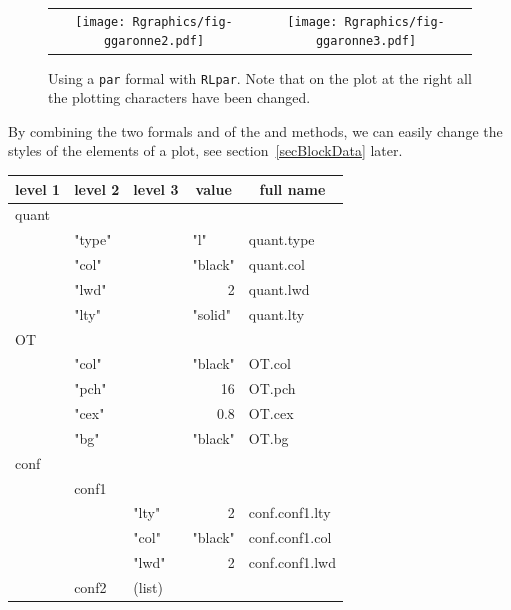 \documentclass[a4paper]{report}
\begin{document}
\begin{figure}
   \centering
   \begin{tabular}{c c} 
     \texttt{[image: Rgraphics/fig-ggaronne2.pdf]} &
     \texttt{[image: Rgraphics/fig-ggaronne3.pdf]} 
   \end{tabular}
   \caption{\label{GGaronne23} Using a \texttt{par} formal with \texttt{RLpar}. Note
   that on the plot at the right all the plotting characters have been changed.}
\end{figure}

By combining the two formals \verb@show@ and \verb@par@ of the
\verb@plot@ and \verb@lines@ methods, we can easily change the styles
of the elements of a plot, see section~\ref{secBlockData} later.


\begin{table}
  \centering \tt \begin{tabular}{|l|l|l|l|l|}
   \hline   \multicolumn{1}{|c|}{\textrm{\bf level 1}} \rule{0pt}{1em} &    \multicolumn{1}{c|}{\textrm{\bf level 2}} &    \multicolumn{1}{c|}{\textrm{\bf level 3}} &    \multicolumn{1}{c|}{\textrm{\bf value}} &     \multicolumn{1}{c|}{\textrm{\bf full name}}\\   \hline \hline quant &  & & & \\ 
     &  "type" & & "l" & quant.type \\ 
     &  "col" & & "black" & quant.col \\ 
     &  "lwd" & & \multicolumn{1}{r|}{2} & quant.lwd \\ 
     &  "lty" & & "solid" & quant.lty \\ 
\hline
OT &  & & & \\ 
     &  "col" & & "black" & OT.col \\ 
     &  "pch" & & \multicolumn{1}{r|}{16} & OT.pch \\ 
     &  "cex" & & \multicolumn{1}{r|}{0.8} & OT.cex \\ 
     &  "bg" & & "black" & OT.bg \\ 
\hline
conf &  & & & \\ 
     &  conf1 &    & & \\ 
     &  & "lty"& \multicolumn{1}{r|}{2} & conf.conf1.lty \\ 
     &  & "col" & "black" & conf.conf1.col \\ 
     &  & "lwd"& \multicolumn{1}{r|}{2} & conf.conf1.lwd \\ 
     &  conf2 & (list)   &  &\\ 

\end{tabular}
\end{table}
\end{document}
